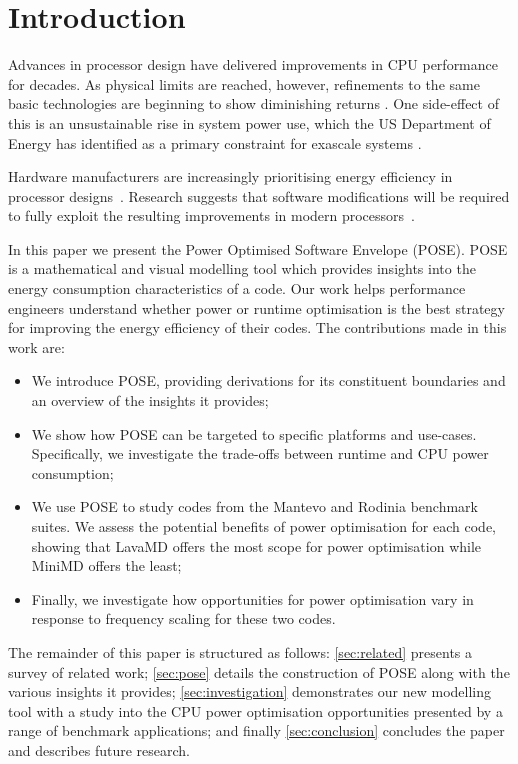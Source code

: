 \section{Introduction} \noindent
Advances in processor design have delivered improvements in CPU performance for decades. As physical limits are reached, however, refinements to the same basic technologies are beginning to show diminishing returns \cite{esmaeilzadeh:2011aa}. 
One side-effect of this is an unsustainable rise in system power use, which the US Department of Energy has identified as a primary constraint for exascale systems \cite{shalf:2011aa}.

Hardware manufacturers are increasingly prioritising energy efficiency in processor designs~\cite{kurd:2014aa}. 
Research suggests that software modifications will be required to fully exploit the resulting improvements in modern processors~\cite{shao:2013aa}.

In this paper we present the Power Optimised Software Envelope (POSE).
POSE is a mathematical and visual modelling tool which provides insights into the energy consumption characteristics of a code.
Our work helps performance engineers understand whether power or runtime optimisation is the best strategy for improving the energy efficiency of their codes.
The contributions made in this work are:
\begin{itemize}
  \item We introduce POSE, providing derivations for its constituent boundaries and an overview of the insights it provides;
  \item We show how POSE can be targeted to specific platforms and use-cases. 
        Specifically, we investigate the trade-offs between runtime and CPU power consumption;
  \item We use POSE to study codes from the Mantevo and Rodinia benchmark suites.
        We assess the potential benefits of power optimisation for each code, showing that LavaMD offers the most scope for power optimisation while MiniMD offers the least;
  \item Finally, we investigate how opportunities for power optimisation vary in response to frequency scaling for these two codes.
\end{itemize}

\noindent
The remainder of this paper is structured as follows:
\autoref{sec:related} presents a survey of related work; 
\autoref{sec:pose} details the construction of POSE along with the various insights it provides;
\autoref{sec:investigation} demonstrates our new modelling tool with a study into the CPU power optimisation opportunities presented by a range of benchmark applications;
and finally \autoref{sec:conclusion} concludes the paper and describes future research.
